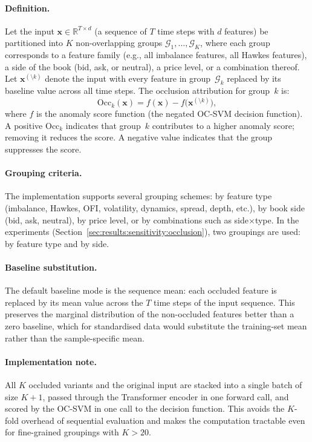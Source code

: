 \documentclass[11pt]{report}
\begin{document}
\paragraph{Definition.}
Let the input $\mathbf{x} \in \mathbb{R}^{T \times d}$ (a sequence of $T$ time steps with $d$ features) be partitioned into $K$ non-overlapping groups $\mathcal{G}_1, \ldots, \mathcal{G}_K$, where each group corresponds to a feature family (e.g., all imbalance features, all Hawkes features), a side of the book (bid, ask, or neutral), a price level, or a combination thereof. Let $\mathbf{x}^{(\setminus k)}$ denote the input with every feature in group~$\mathcal{G}_k$ replaced by its baseline value across all time steps. The occlusion attribution for group~$k$ is:
\begin{equation}
  \label{eq:occlusion}
  \mathrm{Occ}_k(\mathbf{x}) = f(\mathbf{x}) - f\!\bigl(\mathbf{x}^{(\setminus k)}\bigr),
\end{equation}
where $f$ is the anomaly score function (the negated OC-SVM decision function). A positive $\mathrm{Occ}_k$ indicates that group~$k$ contributes to a higher anomaly score; removing it reduces the score. A negative value indicates that the group suppresses the score.

\paragraph{Grouping criteria.}
The implementation supports several grouping schemes: by feature type (imbalance, Hawkes, OFI, volatility, dynamics, spread, depth, etc.), by book side (bid, ask, neutral), by price level, or by combinations such as side$\times$type. In the experiments (Section~\ref{sec:results:sensitivity:occlusion}), two groupings are used: by feature type and by side.

\paragraph{Baseline substitution.}
The default baseline mode is the sequence mean: each occluded feature is replaced by its mean value across the $T$ time steps of the input sequence. This preserves the marginal distribution of the non-occluded features better than a zero baseline, which for standardised data would substitute the training-set mean rather than the sample-specific mean.

\paragraph{Implementation note.}
All $K$ occluded variants and the original input are stacked into a single batch of size $K + 1$, passed through the Transformer encoder in one forward call, and scored by the OC-SVM in one call to the decision function. This avoids the $K$-fold overhead of sequential evaluation and makes the computation tractable even for fine-grained groupings with $K > 20$.
\end{document}
